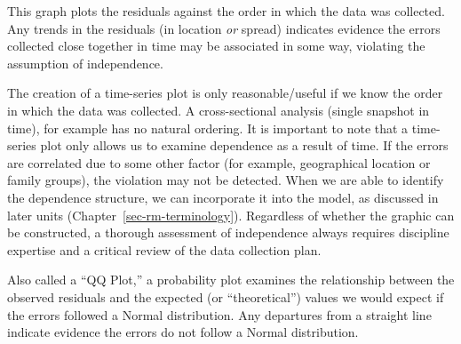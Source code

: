 \documentclass[
  letterpaper,
  DIV=11,
  numbers=noendperiod]{scrreprt}
\theoremstyle{definition}
\theoremstyle{definition}
\theoremstyle{remark}
\begin{document}
\begin{tcolorbox}[enhanced jigsaw, bottomrule=.15mm, titlerule=0mm, bottomtitle=1mm, colback=white, coltitle=black, rightrule=.15mm, leftrule=.75mm, toprule=.15mm, toptitle=1mm, left=2mm, opacityback=0, colframe=quarto-callout-note-color-frame, breakable, title=\textcolor{quarto-callout-note-color}{\faInfo}\hspace{0.5em}{Using the Time-Series Plot of the Residuals}, arc=.35mm, colbacktitle=quarto-callout-note-color!10!white, opacitybacktitle=0.6]

This graph plots the residuals against the order in which the data was
collected. Any trends in the residuals (in location \emph{or} spread)
indicates evidence the errors collected close together in time may be
associated in some way, violating the assumption of independence.

\end{tcolorbox}

The creation of a time-series plot is only reasonable/useful if we know
the order in which the data was collected. A cross-sectional analysis
(single snapshot in time), for example has no natural ordering. It is
important to note that a time-series plot only allows us to examine
dependence as a result of time. If the errors are correlated due to some
other factor (for example, geographical location or family groups), the
violation may not be detected. When we are able to identify the
dependence structure, we can incorporate it into the model, as discussed
in later units (Chapter~\ref{sec-rm-terminology}). Regardless of whether
the graphic can be constructed, a thorough assessment of independence
always requires discipline expertise and a critical review of the data
collection plan.

\begin{tcolorbox}[enhanced jigsaw, bottomrule=.15mm, titlerule=0mm, bottomtitle=1mm, colback=white, coltitle=black, rightrule=.15mm, leftrule=.75mm, toprule=.15mm, toptitle=1mm, left=2mm, opacityback=0, colframe=quarto-callout-note-color-frame, breakable, title=\textcolor{quarto-callout-note-color}{\faInfo}\hspace{0.5em}{Using the Probability Plot of the Residuals}, arc=.35mm, colbacktitle=quarto-callout-note-color!10!white, opacitybacktitle=0.6]

Also called a ``QQ Plot,'' a probability plot examines the relationship
between the observed residuals and the expected (or ``theoretical'')
values we would expect if the errors followed a Normal distribution. Any
departures from a straight line indicate evidence the errors do not
follow a Normal distribution.

\end{tcolorbox}
\end{document}
